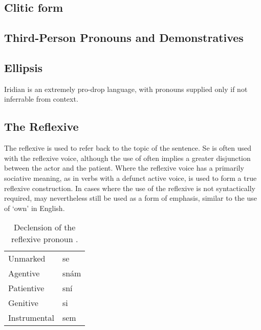 \subsection{Clitic form}

\subsection{Third-Person Pronouns and Demonstratives}


\subsection{Ellipsis}
Iridian is an extremely pro-drop language, with pronouns supplied only if not inferrable from context.


\subsection{The Reflexive }

The reflexive  is used to refer back to the topic of the sentence. Se is often used with the reflexive voice, although the use of  often implies a greater disjunction between the actor and the patient. Where the reflexive voice has a primarily sociative meaning, as in verbs with a defunct active voice,  is used to form a true reflexive construction. In cases where the use of the reflexive is not syntactically required,  may nevertheless still be used as a form of emphasis, similar to the use of `own' in English.

\pex    \a {}
        \a {}
\xe

\pex
        \a {}
        \a {} 
\xe


\begin{table}
    \footnotesize\sffamily
    \caption{Declension of the reflexive pronoun .}
    \medskip
    \begin{tabu} to 0.5 
        \toprule
        Unmarked        & se\\
        Agentive        & snám\\
        Patientive      & sní\\
        Genitive        & si\\
        Instrumental    & sem\\
        \bottomrule
    \end{tabu}
\end{table}


